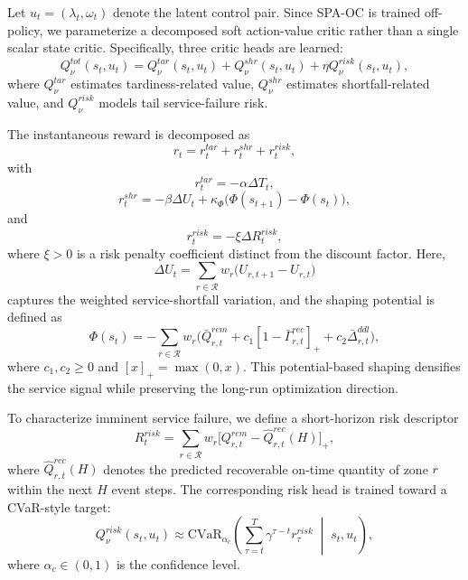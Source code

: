 \documentclass[a4paper,fleqn]{cas-sc}
\begin{document}
Let $u_t=(\lambda_t,\omega_t)$ denote the latent control pair. Since SPA-OC is trained off-policy, we parameterize a decomposed soft action-value critic rather than a single scalar state critic. Specifically, three critic heads are learned:
\begin{equation}
Q_{\nu}^{tot}(s_t,u_t)=
Q_{\nu}^{tar}(s_t,u_t)
+
Q_{\nu}^{shr}(s_t,u_t)
+
\eta Q_{\nu}^{risk}(s_t,u_t),
\label{eq:q_total}
\end{equation}
where $Q_{\nu}^{tar}$ estimates tardiness-related value, $Q_{\nu}^{shr}$ estimates shortfall-related value, and $Q_{\nu}^{risk}$ models tail service-failure risk.

The instantaneous reward is decomposed as
\begin{equation}
r_t=r_t^{tar}+r_t^{shr}+r_t^{risk},
\label{eq:reward_decomp}
\end{equation}
with
\begin{equation}
r_t^{tar}=-\alpha \Delta T_t,
\label{eq:reward_tar}
\end{equation}
\begin{equation}
r_t^{shr}=-\beta \Delta U_t+\kappa_{\Phi}\big(\Phi(s_{t+1})-\Phi(s_t)\big),
\label{eq:reward_shr}
\end{equation}
and
\begin{equation}
r_t^{risk}=-\xi \Delta R_t^{risk},
\label{eq:reward_risk}
\end{equation}
where $\xi>0$ is a risk penalty coefficient distinct from the discount factor. Here,
\begin{equation}
\Delta U_t=
\sum_{r\in\mathcal{R}}w_r\big(U_{r,t+1}-U_{r,t}\big)
\label{eq:deltaU}
\end{equation}
captures the weighted service-shortfall variation, and the shaping potential is defined as
\begin{equation}
\Phi(s_t)=
-\sum_{r\in\mathcal{R}} w_r
\Big(
\bar Q_{r,t}^{rem}
+ c_1[1-\bar \Gamma_{r,t}^{rec}]_{+}
+ c_2 \bar \Delta_{r,t}^{ddl}
\Big),
\label{eq:potential_shaping}
\end{equation}
where $c_1,c_2\ge 0$ and $[x]_+=\max(0,x)$. This potential-based shaping densifies the service signal while preserving the long-run optimization direction.

To characterize imminent service failure, we define a short-horizon risk descriptor
\begin{equation}
R_t^{risk}=
\sum_{r\in\mathcal{R}}
w_r
\big[
Q_{r,t}^{rem}-\widehat{Q}_{r,t}^{rec}(H)
\big]_{+},
\label{eq:risk_descriptor}
\end{equation}
where $\widehat{Q}_{r,t}^{rec}(H)$ denotes the predicted recoverable on-time quantity of zone $r$ within the next $H$ event steps. The corresponding risk head is trained toward a CVaR-style target:
\begin{equation}
Q_{\nu}^{risk}(s_t,u_t)\approx
\mathrm{CVaR}_{\alpha_c}\!\left(
\sum_{\tau=t}^{T}\gamma^{\tau-t}r_{\tau}^{risk}
\;\middle|\;
s_t,u_t
\right),
\label{eq:cvar_target}
\end{equation}
where $\alpha_c\in(0,1)$ is the confidence level.
\end{document}
